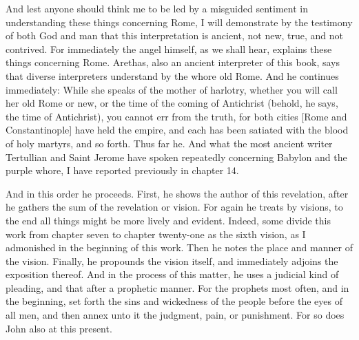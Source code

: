 And lest anyone should think me to be led by a misguided sentiment in understanding these things concerning Rome, I will demonstrate by the testimony of both God and man that this interpretation is ancient, not new, true, and not contrived. For immediately the angel himself, as we shall hear, explains these things concerning Rome. Arethas, also an ancient interpreter of this book, says that diverse interpreters understand by the whore old Rome. And he continues immediately: While she speaks of the mother of harlotry, whether you will call her old Rome or new, or the time of the coming of Antichrist (behold, he says, the time of Antichrist), you cannot err from the truth, for both cities [Rome and Constantinople] have held the empire, and each has been satiated with the blood of holy martyrs, and so forth. Thus far he. And what the most ancient writer Tertullian and Saint Jerome have spoken repeatedly concerning Babylon and the purple whore, I have reported previously in chapter 14.

And in this order he proceeds. First, he shows the author of this revelation, after he gathers the sum of the revelation or vision. For again he treats by visions, to the end all things might be more lively and evident. Indeed, some divide this work from chapter seven to chapter twenty-one as the sixth vision, as I admonished in the beginning of this work. Then he notes the place and manner of the vision. Finally, he propounds the vision itself, and immediately adjoins the exposition thereof. And in the process of this matter, he uses a judicial kind of pleading, and that after a prophetic manner. For the prophets most often, and in the beginning, set forth the sins and wickedness of the people before the eyes of all men, and then annex unto it the judgment, pain, or punishment. For so does John also at this present.

